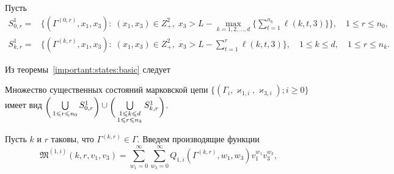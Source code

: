 \documentclass[a4paper,12pt,russian]{extarticle}
\begin{document}
Пусть
\begin{align*}
  S^1_{0,r} = & 
  \biggl\{
  (\Gamma^{(0,r)},x_1, x_3) \colon \; (x_1, x_3)\in Z^2_+,\; x_3 > L - \max\limits_{k=1, 2,
    \ldots, d}
  \biggl\{ \sum_{t=1}^{n_k} \ell({k,t,3}) \biggl\}\biggl\}, 
  \quad 1 \leqslant r \leqslant n_0, \\
  S^1_{k,r} = & 
  \biggl\{
  (\Gamma^{(k,r)},x_1, x_3) \colon \; (x_1, x_3)\in Z^2_+,\; x_3 > L - \sum_{t=1}^{r} \ell({k,t,3})
  \biggr\}, 
  \quad 1 \leqslant k \leqslant d, \quad 1 \leqslant r \leqslant n_k.
\end{align*}

Из теоремы~\ref{important:states:basic} следует 
\begin{theorem}
Множество существенных состояний марковской цепи $\{(\Gamma_i, \varkappa_{1,i},\varkappa_{3,i}); i \geqslant 0\}$ имеет вид $\raisebox{-.5ex}{$\biggl($}\bigcup\limits_{1 \leqslant r \leqslant n_0}S^1_{0,r}\raisebox{-.5ex}{$\biggr)$}\cup \raisebox{-.5ex}{$\biggl($}\bigcup\limits_{\substack{1 \leqslant k \leqslant d\\ 1 \leqslant r \leqslant n_k}} S^1_{k,r}\raisebox{-.5ex}{$\biggr)$}$.
\end{theorem}


Пусть $k$ и $r$ таковы, что $\Gamma^{(k,r)}\in \Gamma$. Введем производящие функции
\begin{equation*}
\mathfrak{M}^{(1,i)}(k,r,v_1,v_3) = \sum_{w_1=0}^{\infty}\sum_{w_3=0}^{\infty} Q_{1,i}(\Gamma^{(k,r)},w_1,w_3) v_1^{w_1} v_3^{w_3},
\end{equation*}
\end{document}
